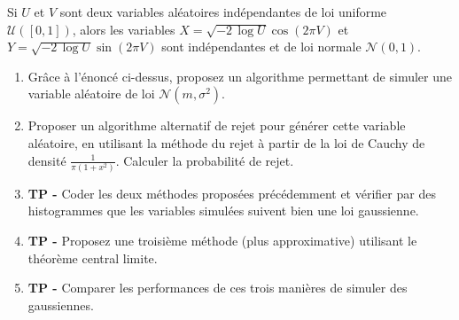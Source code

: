 \documentclass{exercices}
\begin{document}
%

\begin{exercice}
Si $U$ et $V$ sont deux variables
al\'eatoires ind\'ependantes de loi uniforme ${\mathcal U}([0,1])$,
alors les variables $X=\sqrt{-2\,\log U}\cos(2\pi V)$ et
$Y=\sqrt{-2\,\log U}\sin(2\pi V)$
sont ind\'ependantes et de loi normale ${\mathcal N}(0,1)$.
\begin{enumerate}
\item Grâce à l'énoncé ci-dessus, proposez un algorithme permettant de simuler une variable aléatoire de loi $\mathcal{N}(m,\sigma^2)$.
\item Proposer un algorithme alternatif de rejet pour générer cette variable aléatoire, en utilisant la méthode du rejet à partir de la loi de Cauchy de densité $\frac{1}{\pi(1+x^2)}.$ Calculer la probabilité de rejet.
\item \textbf{TP -}  Coder les deux méthodes proposées précédemment et vérifier par des histogrammes que les variables simulées suivent bien une loi gaussienne.
\item \textbf{TP -} Proposez une troisième méthode (plus approximative) utilisant le théorème central limite.
\item \textbf{TP -} Comparer les performances de ces trois manières de simuler des gaussiennes.
\end{enumerate}
\end{exercice}

%
%
\end{document}
